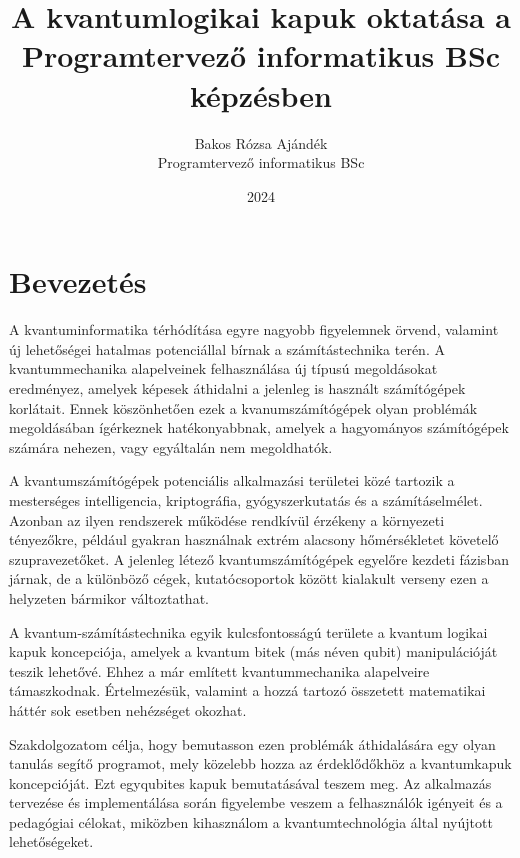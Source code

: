 \documentclass[
]{thesis-ekf}
\theoremstyle{definition}
\theoremstyle{remark}
\begin{document}
\title{A kvantumlogikai kapuk oktatása a Programtervező informatikus BSc képzésben}
\author{Bakos Rózsa Ajándék\\Programtervező informatikus BSc}
\date{2024}
\maketitle
\tableofcontents

\chapter*{Bevezetés}
A kvantuminformatika térhódítása egyre nagyobb figyelemnek örvend, valamint új lehetőségei hatalmas potenciállal bírnak a számítástechnika terén. A kvantummechanika alapelveinek felhasználása új típusú megoldásokat eredményez, amelyek képesek áthidalni a jelenleg is használt számítógépek korlátait. Ennek köszönhetően ezek a kvanumszámítógépek olyan problémák megoldásában ígérkeznek hatékonyabbnak, amelyek a hagyományos számítógépek számára nehezen, vagy egyáltalán nem megoldhatók.

A kvantumszámítógépek potenciális alkalmazási területei közé tartozik a mesterséges intelligencia, kriptográfia, gyógyszerkutatás és a számításelmélet. Azonban az ilyen rendszerek működése rendkívül érzékeny a környezeti tényezőkre, például gyakran használnak extrém alacsony hőmérsékletet követelő szupravezetőket. A jelenleg létező kvantumszámítógépek egyelőre kezdeti fázisban járnak, de a különböző cégek, kutatócsoportok között kialakult verseny ezen a helyzeten bármikor változtathat.

A kvantum-számítástechnika egyik kulcsfontosságú területe a kvantum logikai kapuk koncepciója, amelyek a kvantum bitek (más néven qubit) manipulációját teszik lehetővé. Ehhez a már említett kvantummechanika alapelveire támaszkodnak. Értelmezésük, valamint a hozzá tartozó összetett matematikai háttér sok esetben nehézséget okozhat.

Szakdolgozatom célja, hogy bemutasson ezen problémák áthidalására egy olyan tanulás segítő programot, mely közelebb hozza az érdeklődőkhöz a kvantumkapuk koncepcióját. Ezt egyqubites kapuk bemutatásával teszem meg. Az alkalmazás tervezése és implementálása során figyelembe veszem a felhasználók igényeit és a pedagógiai célokat, miközben kihasználom a kvantumtechnológia által nyújtott lehetőségeket.
\end{document}
